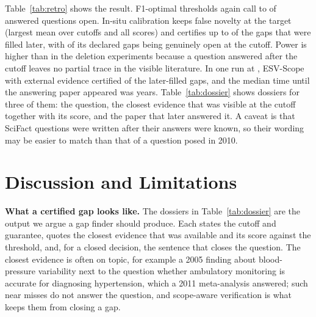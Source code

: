 \documentclass[conference,a4paper]{IEEEtran}
\theoremstyle{definition}
\begin{document}
Table~\ref{tab:retro} shows the result. F1-optimal thresholds again call \RetroFoneMin{} to \RetroFoneMax{} of answered questions open. In-situ calibration keeps false novelty at the target (largest mean \RetroMaxFN{} over cutoffs \RetroYears{} and all scores) and certifies up to \RetroBestPow{} of the gaps that were filled later, with \RetroBestPrec{} of its declared gaps being genuinely open at the cutoff. Power is higher than in the deletion experiments because a question answered after the cutoff leaves no partial trace in the visible literature. In one run at \RetroY{}, ESV-Scope with external evidence certified \RetroNdossier{} of the later-filled gaps, and the median time until the answering paper appeared was \RetroLag{} years. Table~\ref{tab:dossier} shows dossiers for three of them: the question, the closest evidence that was visible at the cutoff together with its score, and the paper that later answered it. A caveat is that SciFact questions were written after their answers were known, so their wording may be easier to match than that of a question posed in 2010.

\begin{table}[t]
\centering
\caption{Retrospective certification at the \RetroY{} cutoff, mean over 500 splits. FN: false novelty on questions answered by the cutoff; Filled: share of later-filled gaps certified open; Prec.: share of declared gaps that were open at the cutoff.}
\label{tab:retro}

\end{table}

\begin{table}[t]
\centering
\caption{Gap dossiers produced by the certified rule (ESV-Scope with external evidence, in-situ calibration) at the \RetroY{} cutoff. Each question was certified open with false novelty $\le 0.1$; the right column is the later paper, unseen at the cutoff, whose rationale answered it.}
\label{tab:dossier}
\footnotesize

\end{table}

\section{Discussion and Limitations}
\textbf{What a certified gap looks like.} The dossiers in Table~\ref{tab:dossier} are the output we argue a gap finder should produce. Each states the cutoff and guarantee, quotes the closest evidence that was available and its score against the threshold, and, for a closed decision, the sentence that closes the question. The closest evidence is often on topic, for example a 2005 finding about blood-pressure variability next to the question whether ambulatory monitoring is accurate for diagnosing hypertension, which a 2011 meta-analysis answered; such near misses do not answer the question, and scope-aware verification is what keeps them from closing a gap.
\end{document}
